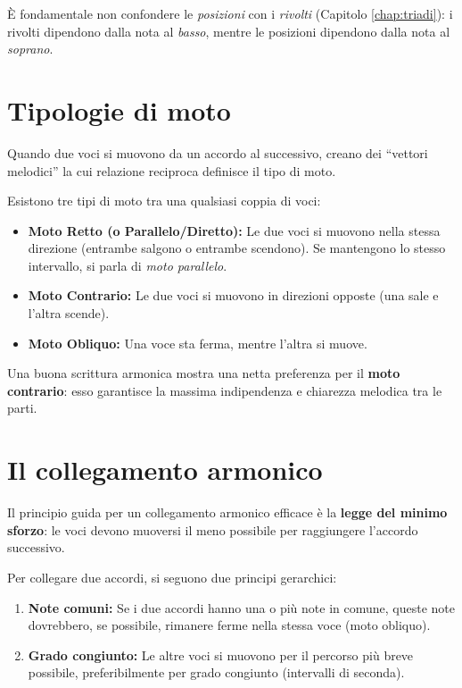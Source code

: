 È fondamentale non confondere le \textit{posizioni} con i \textit{rivolti} (Capitolo \ref{chap:triadi}): i rivolti dipendono dalla nota al \textit{basso}, mentre le posizioni dipendono dalla nota al \textit{soprano}.

\section{Tipologie di moto}
\label{sec:tipologie_moto}

Quando due voci si muovono da un accordo al successivo, creano dei ``vettori melodici'' la cui relazione reciproca definisce il tipo di moto.

\begin{definizione}
	\label{def:tipi_moto}
	Esistono tre tipi di moto tra una qualsiasi coppia di voci:
	\begin{itemize}
		\item \textbf{Moto Retto (o Parallelo/Diretto):} Le due voci si muovono nella stessa direzione (entrambe salgono o entrambe scendono). Se mantengono lo stesso intervallo, si parla di \textit{moto parallelo}.
		\item \textbf{Moto Contrario:} Le due voci si muovono in direzioni opposte (una sale e l'altra scende).
		\item \textbf{Moto Obliquo:} Una voce sta ferma, mentre l'altra si muove.
	\end{itemize}
\end{definizione}

Una buona scrittura armonica mostra una netta preferenza per il \textbf{moto contrario}: esso garantisce la massima indipendenza e chiarezza melodica tra le parti.

\section{Il collegamento armonico}
\label{sec:collegamento_armonico}

Il principio guida per un collegamento armonico efficace è la \textbf{legge del minimo sforzo}: le voci devono muoversi il meno possibile per raggiungere l'accordo successivo.

\begin{regola}
	\label{reg:minima_azione}
	Per collegare due accordi, si seguono due principi gerarchici:
	\begin{enumerate}
		\item \textbf{Note comuni:} Se i due accordi hanno una o più note in comune, queste note dovrebbero, se possibile, rimanere ferme nella stessa voce (moto obliquo).
		\item \textbf{Grado congiunto:} Le altre voci si muovono per il percorso più breve possibile, preferibilmente per grado congiunto (intervalli di seconda).
	\end{enumerate}
\end{regola}

